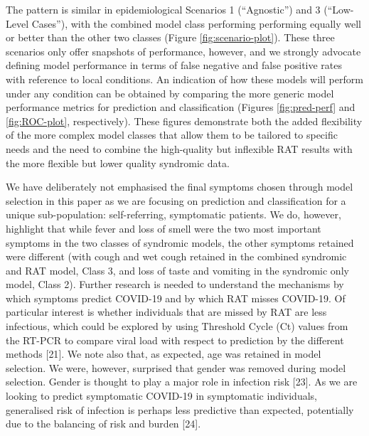 \documentclass[]{elsarticle} %
\begin{document}
The pattern is similar in epidemiological Scenarios 1 (``Agnostic'') and 3 (``Low-Level Cases''), with the combined model class performing performing equally well or better than the other two classes (Figure \ref{fig:scenario-plot}).
These three scenarios only offer snapshots of performance, however, and we strongly advocate defining model performance in terms of false negative and false positive rates with reference to local conditions.
An indication of how these models will perform under any condition can be obtained by comparing the more generic model performance metrics for prediction and classification (Figures \ref{fig:pred-perf} and \ref{fig:ROC-plot}, respectively).
These figures demonstrate both the added flexibility of the more complex model classes that allow them to be tailored to specific needs and the need to combine the high-quality but inflexible RAT results with the more flexible but lower quality syndromic data.

We have deliberately not emphasised the final symptoms chosen through model selection in this paper as we are focusing on prediction and classification for a unique sub-population: self-referring, symptomatic patients.
We do, however, highlight that while fever and loss of smell were the two most important symptoms in the two classes of syndromic models,
the other symptoms retained were different (with cough and wet cough retained in the combined syndromic and RAT model, Class 3, and loss of taste and vomiting in the syndromic only model, Class 2).
Further research is needed to understand the mechanisms by which symptoms predict COVID-19 and by which RAT misses COVID-19.
Of particular interest is whether individuals that are missed by RAT are less infectious, which could be explored by using Threshold Cycle (Ct) values from the RT-PCR to compare viral load with respect to prediction by the different methods {[}21{]}.
We note also that, as expected, age was retained in model selection.
We were, however, surprised that gender was removed during model selection.
Gender is thought to play a major role in infection risk {[}23{]}.
As we are looking to predict symptomatic COVID-19 in symptomatic individuals, generalised risk of infection is perhaps less predictive than expected, potentially due to the balancing of risk and burden {[}24{]}.
\end{document}
